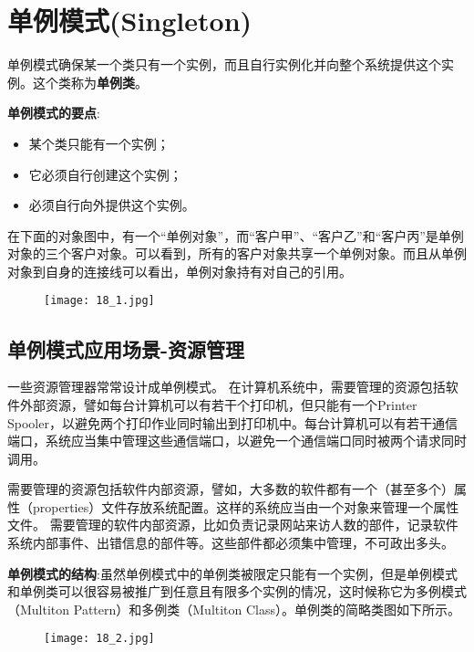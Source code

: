 \documentclass[../main.tex]{subfiles}
\begin{document}
\section{单例模式(Singleton)}
单例模式确保某一个类只有一个实例，而且自行实例化并向整个系统提供这个实例。这个类称为\textbf{单例类}。

\textbf{单例模式的要点}:
\begin{itemize}
  \item 某个类只能有一个实例；
  \item 它必须自行创建这个实例；
  \item 必须自行向外提供这个实例。
\end{itemize}
%
在下面的对象图中，有一个``单例对象''，而``客户甲''、``客户乙''和``客户丙''是单例对象的三个客户对象。可以看到，所有的客户对象共享一个单例对象。而且从单例对象到自身的连接线可以看出，单例对象持有对自己的引用。
%
\begin{figure}[H]
  \texttt{[image: 18\_1.jpg]}
\end{figure}
%
\subsection{单例模式应用场景-资源管理}
\noindent 一些资源管理器常常设计成单例模式。
在计算机系统中，需要管理的资源包括软件外部资源，譬如每台计算机可以有若干个打印机，但只能有一个Printer Spooler，以避免两个打印作业同时输出到打印机中。每台计算机可以有若干通信端口，系统应当集中管理这些通信端口，以避免一个通信端口同时被两个请求同时调用。

\noindent 需要管理的资源包括软件内部资源，譬如，大多数的软件都有一个（甚至多个）属性（properties）文件存放系统配置。这样的系统应当由一个对象来管理一个属性文件。
需要管理的软件内部资源，比如负责记录网站来访人数的部件，记录软件系统内部事件、出错信息的部件等。这些部件都必须集中管理，不可政出多头。

\textbf{单例模式的结构}:虽然单例模式中的单例类被限定只能有一个实例，但是单例模式和单例类可以很容易被推广到任意且有限多个实例的情况，这时候称它为多例模式（Multiton Pattern）和多例类（Multiton Class）。单例类的简略类图如下所示。
\begin{figure}[H]
  \texttt{[image: 18\_2.jpg]}
\end{figure}
\end{document}
